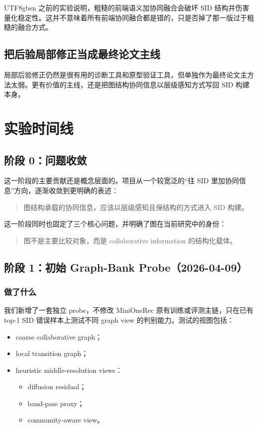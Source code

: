 \documentclass[11pt]{article}
\begin{document}
\begin{CJK*}{UTF8}{gbsn}
之前的实验说明，粗糙的前端语义加协同融合会破坏 SID 结构并伤害量化稳定性。这并不意味着所有前端协同融合都是错的，只是否掉了那一版过于粗糙的融合方式。

\subsection{把后验局部修正当成最终论文主线}

局部后验修正仍然是很有用的诊断工具和原型验证工具，但单独作为最终论文主方法太弱。更有价值的主线，还是把图结构协同信息以层级感知方式写回 SID 构建本身。

\section{实验时间线}

\subsection{阶段 0：问题收敛}

这一阶段的主要贡献还是概念层面的。项目从一个较宽泛的“往 SID 里加协同信息”方向，逐渐收敛到更明确的表述：

\begin{quote}
图结构承载的协同信息，应该以层级感知且保结构的方式进入 SID 构建。
\end{quote}

这一阶段同时也固定了三个核心问题，并明确了图在当前研究中的身份：

\begin{quote}
图不是主要比较对象，而是 collaborative information 的结构化载体。
\end{quote}

\subsection{阶段 1：初始 Graph-Bank Probe（2026-04-09）}

\subsubsection*{做了什么}

我们新增了一套独立 probe，不修改 MiniOneRec 原有训练或评测主链，只在已有 top-1 SID 错误样本上测试不同 graph view 的判别能力。测试的视图包括：

\begin{itemize}
  \item coarse collaborative graph；
  \item local transition graph；
  \item heuristic middle-resolution views：
  \begin{itemize}
    \item diffusion residual；
    \item band-pass proxy；
    \item community-aware view。
  \end{itemize}
\end{itemize}


\end{CJK*}
\end{document}
